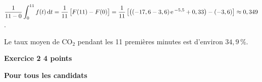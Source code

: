 \documentclass[10pt]{article}
\renewcommand{\d}{\mathrm{\,d}}%
\newcommand{\e}{\mathrm{\,e\,}}%
\newcommand{\ds}{\displaystyle}
\begin{document}
\begin{enumerate}
\begin{enumerate}
$\dfrac{1}{11-0} \ds\int_{0}^{11} f(t) \d t= \dfrac{1}{11} \left [ F(11)- F(0)\strut\right ]
		= \dfrac{1}{11} \left [ \left ( (-17,6 - 3,6) \e^{-5,5} + 0,33\right ) -  (-3,6)  \right ]
		\approx 0,349$.
		
Le taux moyen de CO$_2$ pendant les 11 premières minutes est d'environ $34,9$\,\%.

	\end{enumerate}
\end{enumerate}

\vspace{0.5cm}

\textbf{\large{Exercice 2} \hfill 4 points}
 
\textbf{Pour tous les candidats}

\medskip

%
\end{document}
